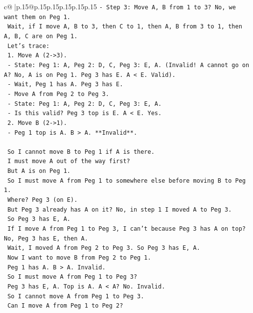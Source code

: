 \documentclass{article}
\begin{document}
{\begin{supertabular}{c@{$\;$}|p{.15\linewidth}@{}p{.15\linewidth}p{.15\linewidth}p{.15\linewidth}p{.15\linewidth}p{.15\linewidth}}
{{{\texttt{{-} Step 3: Move A, B from 1 to 3? No, we want them on Peg 1.} \\
\texttt{  Wait, if I move A, B to 3, then C to 1, then A, B from 3 to 1, then A, B, C are on Peg 1.} \\
\texttt{  Let's trace:} \\
\texttt{  1. Move A (2{-}>3).} \\
\texttt{     {-} State: Peg 1: A, Peg 2: D, C, Peg 3: E, A. (Invalid! A cannot go on A? No, A is on Peg 1. Peg 3 has E. A < E. Valid).} \\
\texttt{     {-} Wait, Peg 1 has A. Peg 3 has E.} \\
\texttt{     {-} Move A from Peg 2 to Peg 3.} \\
\texttt{     {-} State: Peg 1: A, Peg 2: D, C, Peg 3: E, A.} \\
\texttt{     {-} Is this valid? Peg 3 top is E. A < E. Yes.} \\
\texttt{  2. Move B (2{-}>1).} \\
\texttt{     {-} Peg 1 top is A. B > A. **Invalid**.} \\
\\ 
\texttt{  So I cannot move B to Peg 1 if A is there.} \\
\texttt{  I must move A out of the way first?} \\
\texttt{  But A is on Peg 1.} \\
\texttt{  So I must move A from Peg 1 to somewhere else before moving B to Peg 1.} \\
\texttt{  Where? Peg 3 (on E).} \\
\texttt{  But Peg 3 already has A on it? No, in step 1 I moved A to Peg 3.} \\
\texttt{  So Peg 3 has E, A.} \\
\texttt{  If I move A from Peg 1 to Peg 3, I can't because Peg 3 has A on top? No, Peg 3 has E, then A.} \\
\texttt{  Wait, I moved A from Peg 2 to Peg 3. So Peg 3 has E, A.} \\
\texttt{  Now I want to move B from Peg 2 to Peg 1.} \\
\texttt{  Peg 1 has A. B > A. Invalid.} \\
\texttt{  So I must move A from Peg 1 to Peg 3?} \\
\texttt{  Peg 3 has E, A. Top is A. A < A? No. Invalid.} \\
\texttt{  So I cannot move A from Peg 1 to Peg 3.} \\
\texttt{  Can I move A from Peg 1 to Peg 2?} \\
}}}
\end{supertabular}}
\end{document}
